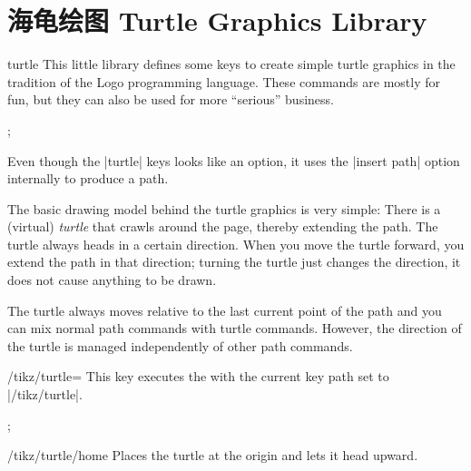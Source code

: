 %
%
%


\section{海龟绘图 Turtle Graphics Library}
\label{section-library-tutrle}

\begin{tikzlibrary}{turtle}
    This little library defines some keys to create simple turtle graphics in
    the tradition of the Logo programming language. These commands are mostly
    for fun, but they can also be used for more ``serious'' business.
\begin{codeexample}[preamble={\usetikzlibrary{turtle}}]
\tikz[turtle/distance=2mm]
  \draw [turtle={home,forward,right,forward,left,forward,left,forward}];
\end{codeexample}
\end{tikzlibrary}

Even though the |turtle| keys looks like an option, it uses the |insert path|
option internally to produce a path.

The basic drawing model behind the turtle graphics is very simple: There is a
(virtual) \emph{turtle} that crawls around the page, thereby extending the
path. The turtle always heads in a certain direction. When you move the turtle
forward, you extend the path in that direction; turning the turtle just changes
the direction, it does not cause anything to be drawn.

The turtle always moves relative to the last current point of the path and you
can mix normal path commands with turtle commands. However, the direction of
the turtle is managed independently of other path commands.

\begin{key}{/tikz/turtle=}
    This key executes the  with the current key path set to
    |/tikz/turtle|.
\begin{codeexample}[preamble={\usetikzlibrary{turtle}}]
\tikz[turtle/distance=2mm]
  \draw [turtle={home,fd,rt,fd,lt,fd,lt,fd}];
\end{codeexample}
\end{key}

\begin{key}{/tikz/turtle/home}
    Places the turtle at the origin and lets it head upward.
\end{key}

